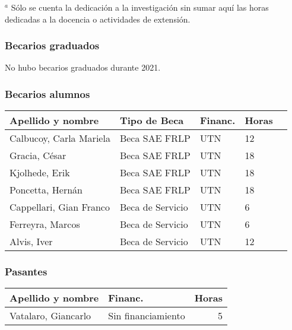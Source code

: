 \documentclass[a4paper,11pt,twoside,final,titlepage,onecolumn,openright]{report}
\begin{document}
\normalsize
\vspace{0.5cm}
$^a$ Sólo se cuenta la dedicación a la investigación sin sumar aquí las horas dedicadas a la docencia o actividades de extensión.

\subsubsection{Becarios graduados}

No hubo becarios graduados durante 2021.


\subsubsection{Becarios alumnos}

\begin{tabular}{l l l l r}
\toprule
Apellido y nombre & Tipo de Beca & Financ. & Horas \\
\midrule
Calbucoy, Carla Mariela& Beca SAE FRLP & UTN & 12 \\
Gracia, César & Beca SAE FRLP & UTN & 18 \\
Kjolhede, Erik & Beca SAE FRLP & UTN & 18 \\
Poncetta, Hernán & Beca SAE FRLP & UTN & 18 \\
Cappellari, Gian Franco & Beca de Servicio & UTN & 6 \\
Ferreyra, Marcos & Beca de Servicio & UTN & 6 \\
Alvis, Iver & Beca de Servicio & UTN & 12 \\
\bottomrule 
\end{tabular}

 \subsubsection{Pasantes}
\begin{tabular}{l l r}
\toprule
Apellido y nombre & Financ. & Horas \\
\midrule
Vatalaro, Giancarlo & Sin financiamiento & 5\\
\bottomrule
\end{tabular}
\end{document}
